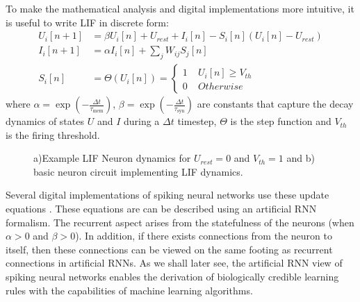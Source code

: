 \documentclass[english]{article}
\renewcommand{\cite}{\citep}
\begin{document}
To make the mathematical analysis and digital implementations more intuitive, it is useful to write \ac{LIF} in discrete form:
\begin{align*}
    U_i[n+1] & = \beta U_i[n] + U_{rest} + I_i[n] - S_i[n] (U_i[n] - U_{rest})\\
    I_i[n+1] & = \alpha I_i[n] + \sum_j W_{ij} S_j[n]\\
    S_i[n] &= \Theta(U_i[n])=\left\{ \begin{array}{cc}
 1 & \;U_i[n]\geq V_{th} \\
 0 & \;Otherwise
 \end{array}\right. 
\end{align*}
where $\alpha=\exp(-\frac{\Delta t}{\tau_{\mathrm{mem}}})$, $\beta=\exp(-\frac{\Delta t}{\tau_{\mathrm{syn}}})$ are constants that capture the decay dynamics of states $U$ and $I$ during a $\Delta t$ timestep, $\Theta$ is the step function and $V_{th}$ is the firing threshold.
\begin{figure}
\centering
\vspace{-0.15in}
\hfil
{}
  \caption{a)Example \acl{LIF} Neuron dynamics for $U_{rest}=0$ and $V_{th}=1$ and b) basic neuron circuit implementing \ac{LIF} dynamics. }
\label{SP}
\vspace{-0.05in}
\end{figure}


Several digital implementations of spiking neural networks use these update equations \cite{Detorakis_etal18_neursyna,Davies_etal18_loihneur}.
%
%
These equations are can be described using an artificial \ac{RNN} \cite{Neftci_etal19_surrgrad} formalism. 
The recurrent aspect arises from the statefulness of the neurons (when $\alpha>0$ and $\beta>0$). 
In addition, if there exists connections from the neuron to itself, then these connections can be viewed on the same footing as recurrent connections in artificial \acp{RNN}. 
As we shall later see, the artificial \ac{RNN} view of spiking neural networks enables the derivation of biologically credible learning rules with the capabilities of machine learning algorithms.
\end{document}
